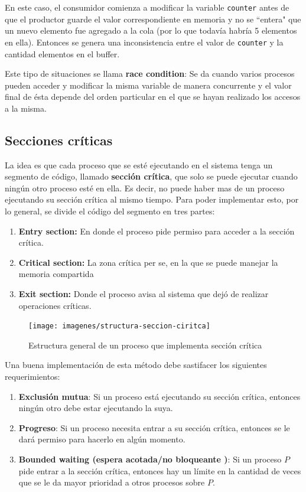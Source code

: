 En este caso, el consumidor comienza a modificar la variable \texttt{counter} antes de que el productor guarde el valor correspondiente en memoria y no se ``entera" que un nuevo elemento fue agregado a la cola (por lo que todavía habría 5 elementos en ella). Entonces se genera una inconsistencia entre el valor de \texttt{counter} y la cantidad elementos en el buffer.

Este tipo de situaciones se llama \textbf{race condition}: Se da cuando varios procesos pueden acceder y modificar la misma variable de manera concurrente y el valor final de ésta depende del orden particular en el que se hayan realizado los accesos a la misma.

\subsection{Secciones críticas}
La idea es que cada proceso que se esté ejecutando en el sistema tenga un segmento de código, llamado \textbf{sección crítica}, que solo se puede ejecutar cuando ningún otro proceso esté en ella. Es decir, no puede haber mas de un proceso ejecutando su sección crítica al mismo tiempo. Para poder implementar esto, por lo general, se divide el código del segmento en tres partes:
\begin{enumerate}
    \item \textbf{Entry section:} En donde el proceso pide permiso para acceder a la sección crítica.
    \item \textbf{Critical section:} La zona crítica per se, en la que se puede manejar la memoria compartida
    \item \textbf{Exit section:} Donde el proceso avisa al sistema que dejó de realizar operaciones críticas.
\end{enumerate}
\begin{figure}
    \centering
    \texttt{[image: imagenes/structura-seccion-ciritca]}
    \caption{Estructura general de un proceso que implementa sección crítica}
    \label{fig:structura-seccion-ciritca}
\end{figure}

Una buena implementación de esta método debe sastifacer los siguientes requerimientos:
\begin{enumerate}
    \item \textbf{Exclusión mutua}: Si un proceso está ejecutando su sección crítica,
     entonces ningún otro debe estar ejecutando la suya.
     \item \textbf{Progreso}: Si un proceso necesita entrar a su sección crítica, entonces se le dará permiso para hacerlo en algún momento.
    \item \textbf{Bounded waiting (espera acotada/no bloqueante	)}: Si un proceso $P$ pide entrar a la sección crítica, entonces hay un límite en la cantidad de veces que se le da mayor prioridad a otros procesos sobre $P$.
\end{enumerate}
